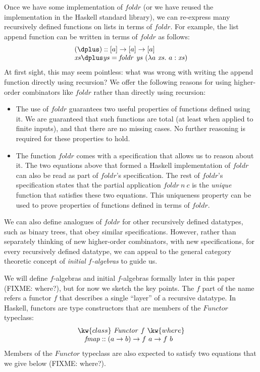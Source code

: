 Once we have some implementation of $\mathit{foldr}$ (or we have
reused the implementation in the Haskell standard library), we can
re-express many recursively defined functions on lists in terms of
$\mathit{foldr}$. For example, the list append function can be written
in terms of $\mathit{foldr}$ as follows:
\begin{displaymath}
  \begin{array}{l}
    (\dplus) :: [a] \to [a] \to [a] \\
    \mathit{xs} \dplus \mathit{ys} = \mathit{foldr}~\mathit{ys}~(\lambda a~\mathit{xs}.~a:\mathit{xs})
  \end{array}
\end{displaymath}
At first sight, this may seem pointless: what was wrong with writing
the append function directly using recursion? We offer the following
reasons for using higher-order combinators like $\mathit{foldr}$
rather than directly using recursion:
\begin{itemize}
\item The use of $\mathit{foldr}$ guarantees two useful properties of
  functions defined using it. We are guaranteed that such functions
  are total (at least when applied to finite inputs), and that there
  are no missing cases. No further reasoning is required for these
  properties to hold.
\item The function $\mathit{foldr}$ comes with a specification that
  allows us to reason about it. The two equations above that formed a
  Haskell implementation of $\mathit{foldr}$ can also be read as part
  of $\mathit{foldr}$'s specification. The rest of $\mathit{foldr}$'s
  specification states that the partial application
  $\mathit{foldr}~n~c$ is the \emph{unique} function that satisfies
  these two equations. This uniqueness property can be used to prove
  properties of functions defined in terms of $\mathit{foldr}$.
\end{itemize}

We can also define analogues of $\mathit{foldr}$ for other recursively
defined datatypes, such as binary trees, that obey similar
specifications. However, rather than separately thinking of new
higher-order combinators, with new specifications, for every
recursively defined datatype, we can appeal to the general category
theoretic concept of \emph{initial $f$-algebras} to guide us.

We will define $f$-algebras and initial $f$-algebras formally later in
this paper (FIXME: where?), but for now we sketch the key points. The
$f$ part of the name refers a functor $f$ that describes a single
``layer'' of a recursive datatype. In Haskell, functors are type
constructors that are members of the $\mathit{Functor}$ typeclass:
\begin{displaymath}
  \begin{array}{l}
    \kw{class}~\mathit{Functor}~f~\kw{where} \\
    \quad \mathit{fmap} :: (a \to b) \to f~a \to f~b
  \end{array}
\end{displaymath}
Members of the $\mathit{Functor}$ typeclass are also expected to
satisfy two equations that we give below (FIXME: where?).

